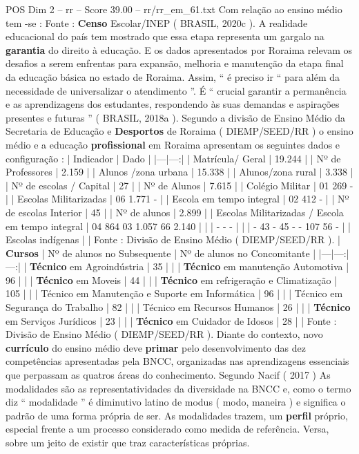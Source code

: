 \begin{textsample}{POS Dim 2 – rr – Score 39.00 – rr/rr\_em\_61.txt}
Com relação ao ensino médio tem -se : Fonte : \textbf{Censo} Escolar/INEP ( BRASIL, 2020c ).
A realidade educacional do país tem mostrado que essa etapa representa um gargalo na \textbf{garantia} do direito à educação.
E os dados apresentados por Roraima relevam os desafios a serem enfrentas para expansão, melhoria e manutenção da etapa final da educação básica no estado de Roraima.
Assim, “ é preciso ir “ para além da necessidade de universalizar o atendimento ”.
É “ crucial garantir a permanência e as aprendizagens dos estudantes, respondendo às suas demandas e aspirações presentes e futuras ” ( BRASIL, 2018a ).
Segundo a divisão de Ensino Médio da Secretaria de Educação e \textbf{Desportos} de Roraima ( DIEMP/SEED/RR ) o ensino médio e a educação \textbf{profissional} em Roraima apresentam os seguintes dados e configuração : | Indicador | Dado | |---|---:| | Matrícula/ Geral | 19.244 | | Nº de Professores | 2.159 | | Alunos /zona urbana | 15.338 | | Alunos/zona rural | 3.338 | | Nº de escolas / Capital | 27 | | Nº de Alunos | 7.615 | | Colégio Militar | 01 269 - | | Escolas Militarizadas | 06 1.771 - | | Escola em tempo integral | 02 412 - | | Nº de escolas Interior | 45 | | Nº de alunos | 2.899 | | Escolas Militarizadas / Escola em tempo integral | 04 864 03 1.057 66 2.140 | | | - - - | | | - 43 - 45 - - 107 56 - | | Escolas indígenas | | Fonte : Divisão de Ensino Médio ( DIEMP/SEED/RR ). | \textbf{Cursos} | Nº de alunos no Subsequente | Nº de alunos no Concomitante | |---|---:|---:| | \textbf{Técnico} em Agroindústria | 35 | | | \textbf{Técnico} em manutenção Automotiva | 96 | | | \textbf{Técnico} em Moveis | 44 | | | \textbf{Técnico} em refrigeração e Climatização | 105 | | | Técnico em Manutenção e Suporte em Informática | 96 | | | Técnico em Segurança do Trabalho | 82 | | | Técnico em Recursos Humanos | 26 | | | \textbf{Técnico} em Serviços Jurídicos | 23 | | | \textbf{Técnico} em Cuidador de Idosos | 28 | | Fonte : Divisão de Ensino Médio ( DIEMP/SEED/RR ).
Diante do contexto, novo \textbf{currículo} do ensino médio deve \textbf{primar} pelo desenvolvimento das dez competências apresentadas pela BNCC, organizadas nas aprendizagens essenciais que perpassam as quatros áreas do conhecimento.
Segundo Nacif ( 2017 ) As modalidades são as representatividades da diversidade na BNCC e, como o termo diz “ modalidade ” é diminutivo latino de modus ( modo, maneira ) e significa o padrão de uma forma própria de ser.
As modalidades trazem, um \textbf{perfil} próprio, especial frente a um processo considerado como medida de referência.
Versa, sobre um jeito de existir que traz características próprias.

\end{textsample}
